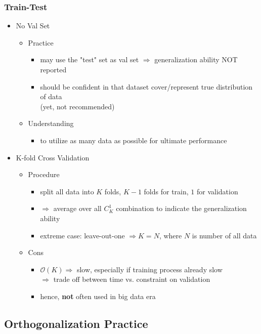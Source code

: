 \subsubsection{Train-Test}
\begin{itemize}
\item No Val Set
	\begin{itemize}
	\item Practice
		\begin{itemize}
		\item may use the "test" set as val set $\Rightarrow$ generalization ability NOT reported
		\item should be confident in that dataset cover/represent true distribution of data \\ 
		(yet, not recommended)
		\end{itemize}
	\item Understanding
		\begin{itemize}
		\item to utilize as many data as possible for ultimate performance
		\end{itemize}
	\end{itemize}
	
\item K-fold Cross Validation
	\begin{itemize}
	\item Procedure
		\begin{itemize}
		\item split all data into $K$ folds, $K-1$ folds for train, $1$ for validation
		\item $\Rightarrow$ average over all $C^1_K$ combination to indicate the generalization ability
		\item extreme case: leave-out-one $\Rightarrow K=N$, where $N$ is number of all data
		\end{itemize}
	\item Cons
		\begin{itemize}
		\item $\mathcal O(K) \Rightarrow$ slow, especially if training process already slow \\
		$\Rightarrow$ trade off between time vs. constraint on validation
		\item hence, \textbf{not} often used in big data era
		\end{itemize}
	\end{itemize}
\end{itemize}

\subsection{Orthogonalization Practice}
